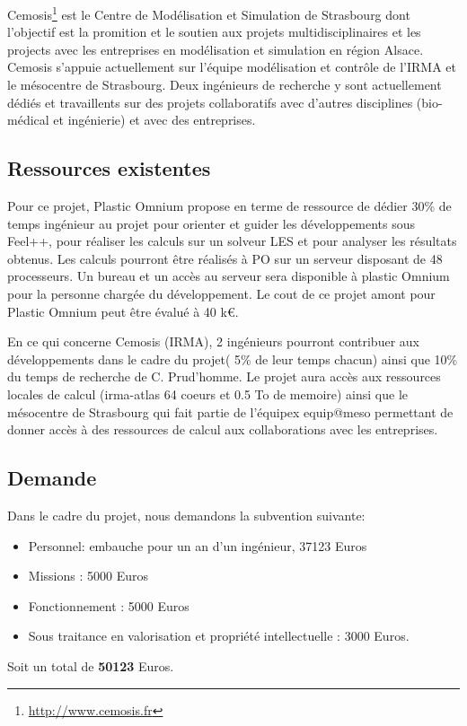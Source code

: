 \documentclass[12pt]{article} \usepackage{fontspec}
\begin{document}
Cemosis\footnote{\url{http://www.cemosis.fr}} est le Centre de Modélisation et
Simulation de Strasbourg dont l'objectif est la promition et le soutien aux
projets multidisciplinaires et les projects avec les entreprises en modélisation
et simulation en région Alsace. Cemosis s'appuie actuellement sur l'équipe
modélisation et contrôle de l'IRMA et le mésocentre de Strasbourg. Deux
ingénieurs de recherche y sont actuellement dédiés et travaillents sur des
projets collaboratifs avec d'autres disciplines (bio-médical et ingénierie) et
avec des entreprises.

\subsection{Ressources existentes}

Pour ce projet, Plastic Omnium propose en terme de ressource de dédier 30\%
de temps ingénieur au projet pour orienter et guider les développements sous
Feel++, pour réaliser les calculs sur un solveur LES et pour analyser les
résultats obtenus. Les calculs pourront être réalisés à PO sur un serveur
disposant de 48 processeurs. Un bureau et un accès au serveur sera disponible à
plastic Omnium pour la personne chargée du développement. Le cout de ce projet
amont pour Plastic Omnium peut être évalué à 40 k€.

En ce qui concerne Cemosis (IRMA), 2 ingénieurs pourront contribuer aux
développements dans le cadre du projet( 5\% de leur temps chacun) ainsi que 10\%
du temps de recherche de C. Prud'homme. Le projet aura accès aux ressources
locales de calcul (irma-atlas 64 coeurs et 0.5 To de memoire) ainsi que le
mésocentre de Strasbourg qui fait partie de l'équipex equip@meso permettant de
donner accès à des ressources de calcul aux collaborations avec les entreprises.

\subsection{Demande}


Dans le cadre du projet, nous demandons la subvention suivante:
\begin{itemize}
\item Personnel: embauche pour un an d'un ingénieur, 37123 Euros
\item Missions : 5000 Euros
\item Fonctionnement  : 5000 Euros
\item Sous traitance en valorisation et propriété intellectuelle : 3000 Euros.
\end{itemize}
Soit un total de \textbf{50123} Euros.
\end{document}
